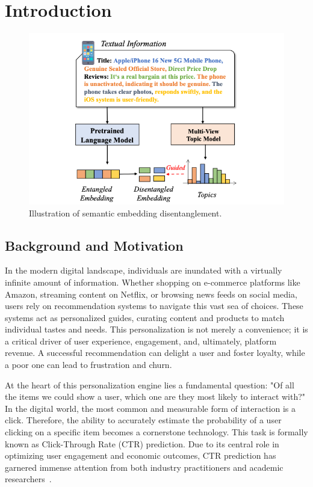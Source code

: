 \chapter{Introduction}

\label{chap:introduction}

\begin{figure}[t]
    \centering
    \includegraphics[width=0.9\linewidth]{Figures/Chapter1/figure1.png}
    \caption{Illustration of semantic embedding disentanglement.}
    \label{fig:disentangle}
\end{figure}

\section{Background and Motivation}

In the modern digital landscape, individuals are inundated with a virtually infinite amount of information. Whether shopping on e-commerce platforms like Amazon, streaming content on Netflix, or browsing news feeds on social media, users rely on recommendation systems to navigate this vast sea of choices. These systems act as personalized guides, curating content and products to match individual tastes and needs. This personalization is not merely a convenience; it is a critical driver of user experience, engagement, and, ultimately, platform revenue. A successful recommendation can delight a user and foster loyalty, while a poor one can lead to frustration and churn.\cite{El-Abidin2023Retention}

At the heart of this personalization engine lies a fundamental question: "Of all the items we could show a user, which one are they most likely to interact with?" In the digital world, the most common and measurable form of interaction is a click. Therefore, the ability to accurately estimate the probability of a user clicking on a specific item becomes a cornerstone technology. This task is formally known as Click-Through Rate (CTR) prediction. Due to its central role in optimizing user engagement and economic outcomes, CTR prediction has garnered immense attention from both industry practitioners and academic researchers~\cite{chen2016deep, zhou2018deep}.

